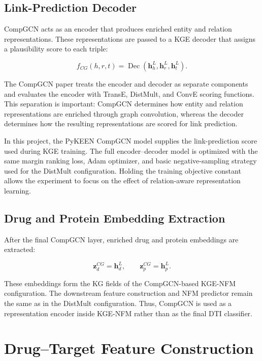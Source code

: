 \subsection{Link-Prediction Decoder}

CompGCN acts as an encoder that produces enriched entity and relation
representations. These representations are passed to a KGE decoder that assigns
a plausibility score to each triple:

\begin{equation}
    f_{CG}(h,r,t)
    =
    \operatorname{Dec}
    \left(
        \mathbf{h}_{h}^{L},
        \mathbf{h}_{r}^{L},
        \mathbf{h}_{t}^{L}
    \right).
\end{equation}

The CompGCN paper treats the encoder and decoder as separate components and
evaluates the encoder with TransE, DistMult, and ConvE scoring functions. This
separation is important: CompGCN determines how entity and relation
representations are enriched through graph convolution, whereas the decoder
determines how the resulting representations are scored for link prediction.

In this project, the PyKEEN CompGCN model supplies the link-prediction score
used during KGE training. The full encoder--decoder model is optimized with the
same margin ranking loss, Adam optimizer, and basic negative-sampling strategy
used for the DistMult configuration. Holding the training objective constant
allows the experiment to focus on the effect of relation-aware representation
learning.

\subsection{Drug and Protein Embedding Extraction}

After the final CompGCN layer, enriched drug and protein embeddings are
extracted:

\begin{equation}
    \mathbf{z}_{d}^{CG}=\mathbf{h}_{d}^{L},
    \qquad
    \mathbf{z}_{p}^{CG}=\mathbf{h}_{p}^{L}.
\end{equation}

These embeddings form the KG fields of the CompGCN-based KGE-NFM
configuration. The downstream feature construction and NFM predictor remain
the same as in the DistMult configuration. Thus, CompGCN is used as a
representation encoder inside KGE-NFM rather than as the final DTI classifier.

\section{Drug--Target Feature Construction}

